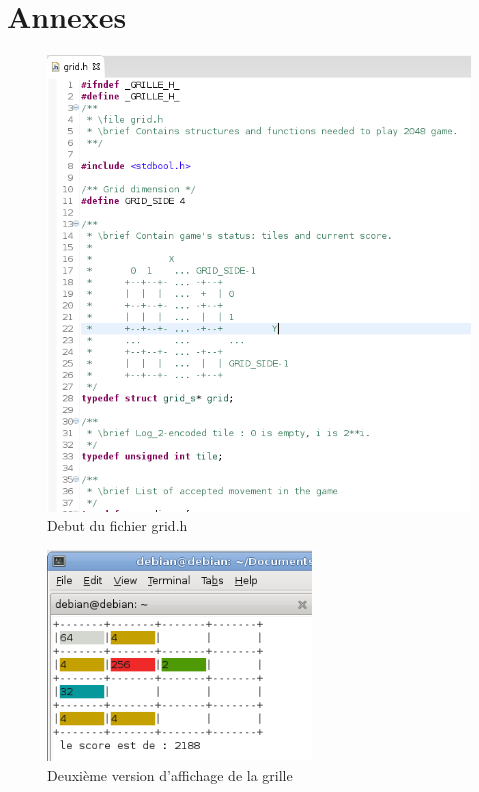 \documentclass[12pt]{article}
\begin{document}
\newpage
\section{Annexes}
\listoffigures
\begin{figure}
   \caption{\label{grid_h} Debut du fichier grid.h}
   \includegraphics[scale=0.6]{grid_h.png}
\end{figure}

\begin{figure}
   \caption{\label{grille_couleur} Deuxième version d'affichage de la grille}
   \includegraphics[width=7cm]{grille_couleur.png}
\end{figure}
\end{document}
